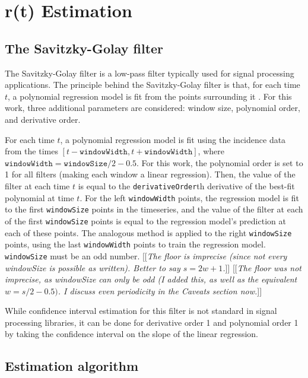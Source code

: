 \documentclass{article}
\newcommand{\code}[1]{\texttt{#1}}
\newcommand{\jd}[1]{[[\textsl{#1}]]} %
\newcommand{\msComment}[1]{[[\textsl{#1}]]}
\begin{document}
\section{r(t) Estimation}

\subsection{The Savitzky-Golay filter}
	The Savitzky-Golay filter is a low-pass filter typically used for signal processing applications. The principle behind the Savitzky-Golay filter is that, for each time $t$, a polynomial regression model is fit from the points surrounding it \cite{SG}. For this work, three additional parameters are considered: window size, polynomial order, and derivative order. 
	
	For each time $t$, a polynomial regression model is fit using the incidence data from the times $[t-\code{windowWidth}, t+\code{windowWidth}]$, where $\code{windowWidth} = \code{windowSize}/2 - 0.5$. For this work, the polynomial order is set to 1 for all filters (making each window a linear regression). Then, the value of the filter at each time $t$ is equal to the \code{derivativeOrder}th derivative of the best-fit polynomial at time $t$. For the left \code{windowWidth} points, the regression model is fit to the first \code{windowSize} points in the timeseries, and the value of the filter at each of the first \code{windowSize} points is equal to the regression model's prediction at each of these points. The analogous method is applied to the right \code{windowSize} points, using the last \code{windowWidth} points to train the regression model. \code{windowSize} must be an odd number.
	\jd{The floor is imprecise (since not every windowSize is possible as written). Better to say $s=2w+1$.} \msComment{The floor was not imprecise, as windowSize can only be odd (I added this, as well as the equivalent $w=s/2 - 0.5)$. I discuss even periodicity in the Caveats section now.}

	While confidence interval estimation for this filter is not standard in signal processing libraries, it can be done for derivative order 1 and polynomial order 1 by taking the confidence interval on the slope of the linear regression.

\subsection{Estimation algorithm}
\end{document}
